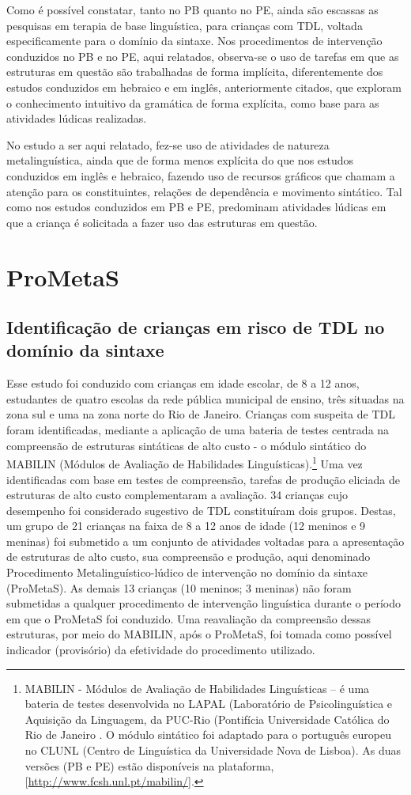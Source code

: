 \documentclass[output=paper,colorlinks,citecolor=brown,booklanguage=portuguese]{langscibook}
\begin{document}
Como é possível constatar, tanto no PB quanto no PE, ainda são escassas as pesquisas em terapia de base linguística, para crianças com TDL, voltada especificamente para o domínio da sintaxe. Nos procedimentos de intervenção conduzidos no PB e no PE, aqui relatados, observa-se o uso de tarefas em que as estruturas em questão são trabalhadas de forma implícita, diferentemente dos estudos conduzidos em hebraico e em inglês, anteriormente citados, que exploram o conhecimento intuitivo da gramática de forma explícita, como base para as atividades lúdicas realizadas. 

No estudo a ser aqui relatado, fez-se uso de atividades de natureza metalinguística, ainda que de forma menos explícita do que nos estudos conduzidos em inglês e hebraico, fazendo uso de recursos gráficos que chamam a atenção para os constituintes, relações de dependência e movimento sintático. Tal como nos estudos conduzidos em PB e PE, predominam atividades lúdicas em que a criança é solicitada a fazer uso das estruturas em questão.

\section{ProMetaS}
\subsection{Identificação de crianças em risco de TDL no domínio da sintaxe}\label{subsec:cap14sec41}
Esse estudo foi conduzido com crianças em idade escolar, de 8 a 12 anos, estudantes de quatro escolas da rede pública municipal de ensino, três situadas na zona sul e uma na zona norte do Rio de Janeiro. Crianças com suspeita de TDL foram identificadas, mediante a aplicação de uma bateria de testes centrada na compreensão de estruturas sintáticas de alto custo - o módulo sintático do MABILIN (Módulos de Avaliação de Habilidades Linguísticas).\footnote{MABILIN - Módulos de Avaliação de Habilidades Linguísticas – é uma bateria de testes desenvolvida no LAPAL (Laboratório de Psicolinguística e Aquisição da Linguagem, da PUC-Rio (Pontifícia Universidade Católica do Rio de Janeiro \citep{Correa2000}. O módulo sintático foi adaptado para o português europeu no CLUNL (Centro de Linguística da Universidade Nova de Lisboa). As duas versões (PB e PE) estão disponíveis na plataforma, [\url{http://www.fcsh.unl.pt/mabilin/}].} Uma vez identificadas com base em testes de compreensão, tarefas de produção eliciada de estruturas de alto custo complementaram a avaliação. 34 crianças cujo desempenho foi considerado sugestivo de TDL constituíram dois grupos. Destas, um grupo de 21 crianças na faixa de 8 a 12 anos de idade (12 meninos e 9 meninas) foi submetido a um conjunto de atividades voltadas para a apresentação de estruturas de alto custo, sua compreensão e produção, aqui denominado Procedimento Metalinguístico-lúdico de intervenção no domínio da sintaxe (ProMetaS). As demais 13 crianças (10 meninos; 3 meninas) não foram submetidas a qualquer procedimento de intervenção linguística durante o período em que o ProMetaS foi conduzido. Uma reavaliação da compreensão dessas estruturas, por meio do MABILIN, após o ProMetaS, foi tomada como possível indicador (provisório) da efetividade do procedimento utilizado.
\end{document}
